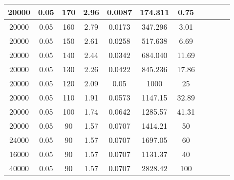 \begin{tabular}{| c | c | c | c || c | c | c | c | c | c | c |}
	20000   & 0.05  & 170            & 2.96           & 0.0087  & 174.311 & 0.75    \\ \hline %
	20000   & 0.05  & 160            & 2.79           & 0.0173  & 347.296 & 3.01    \\ \hline %
	20000   & 0.05  & 150            & 2.61           & 0.0258  & 517.638 & 6.69    \\ \hline %
	20000   & 0.05  & 140            & 2.44           & 0.0342  & 684.040 & 11.69   \\ \hline %
	20000   & 0.05  & 130            & 2.26           & 0.0422  & 845.236 & 17.86   \\ \hline %
	20000   & 0.05  & 120            & 2.09           & 0.05    & 1000    & 25      \\ \hline %
	20000   & 0.05  & 110            & 1.91           & 0.0573  & 1147.15 & 32.89   \\ \hline %
	20000   & 0.05  & 100            & 1.74           & 0.0642  & 1285.57 & 41.31   \\ \hline %
	20000   & 0.05  & 90             & 1.57           & 0.0707  & 1414.21 & 50      \\ \hline %
	24000   & 0.05  & 90             & 1.57           & 0.0707  & 1697.05 & 60      \\ \hline %
	16000   & 0.05  & 90             & 1.57           & 0.0707  & 1131.37 & 40      \\ \hline %
	40000   & 0.05  & 90             & 1.57           & 0.0707  & 2828.42 & 100     \\ \hline %
\end{tabular}
